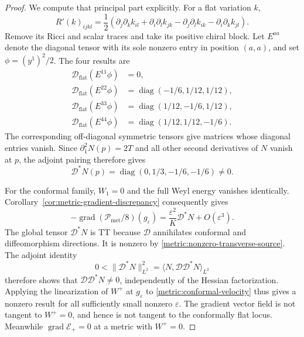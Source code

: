 \documentclass[11pt]{article}
\numberwithin{equation}{section}
\theoremstyle{definition}
\theoremstyle{remark}
\begin{document}
\begin{proof}
We compute that principal part explicitly. For a flat variation $k$,
\[
 R'(k)_{ijkl}=\frac12\left(
 \partial_j\partial_k k_{il}+\partial_i\partial_l k_{jk}
 -\partial_j\partial_l k_{ik}-\partial_i\partial_k k_{jl}\right).
\]
Remove its Ricci and scalar traces and take its positive chiral block.
Let $E^{aa}$ denote the diagonal tensor with its sole nonzero entry in
position $(a,a)$, and set $\phi=(y^1)^2/2$. The four results are
\begin{align*}
 \mathcal D_{\mathrm{flat}}(E^{11}\phi)&=0,\\
 \mathcal D_{\mathrm{flat}}(E^{22}\phi)
 &=\operatorname{diag}(-1/6,1/12,1/12),\\
 \mathcal D_{\mathrm{flat}}(E^{33}\phi)
 &=\operatorname{diag}(1/12,-1/6,1/12),\\
 \mathcal D_{\mathrm{flat}}(E^{44}\phi)
 &=\operatorname{diag}(1/12,1/12,-1/6).
\end{align*}
The corresponding off-diagonal symmetric tensors give matrices whose
diagonal entries vanish. Since $\partial_1^2N(p)=2T$ and all other
second derivatives of $N$ vanish at $p$, the adjoint pairing therefore
gives
\begin{equation}\label{metric:nonzero-transverse-source}
 \mathcal D^*N(p)=\operatorname{diag}(0,1/3,-1/6,-1/6)\ne0.
\end{equation}

For the conformal family, $W_1=0$ and the full Weyl energy vanishes
identically. Corollary~\ref{cor:metric-gradient-discrepancy} consequently
gives
\begin{equation}\label{metric:conformal-velocity}
 -\operatorname{grad}(\mathcal P_{\mathrm{met}}/8)(g_\varepsilon)
 =\frac{\varepsilon^2}{K}\mathcal D^*N+O(\varepsilon^3).
\end{equation}
The global tensor $\mathcal D^*N$ is TT because $\mathcal D$
annihilates conformal and diffeomorphism directions. It is nonzero by
\eqref{metric:nonzero-transverse-source}. The adjoint identity
\[
 0<\|\mathcal D^*N\|_{L^2}^2
 =\langle N,\mathcal D\mathcal D^*N\rangle_{L^2}
\]
therefore shows that $\mathcal D\mathcal D^*N\ne0$, independently of the
Hessian factorization. Applying the linearization of $W^+$ at
$g_\varepsilon$ to \eqref{metric:conformal-velocity} thus gives a
nonzero result for all sufficiently small nonzero $\varepsilon$.
The gradient vector field is not tangent to $W^+=0$, and hence is not
tangent to the conformally flat locus. Meanwhile
$\operatorname{grad}\mathcal E_+=0$ at a metric with $W^+=0$.
\end{proof}
\end{document}
